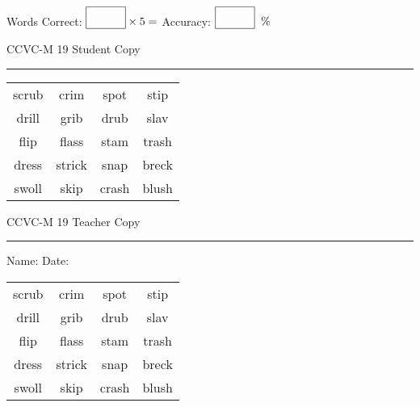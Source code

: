 \documentclass{memoir}
\begin{document}
\small

Words Correct: $\fbox{\phantom{\huge 100}} \times 5 = $ Accuracy: $\fbox{\phantom{\huge 100}}\;\; \%$ 

\vfill

\newpage


\footnotesize \noindent
CCVC-M 19 \hfill Student Copy
\smallskip
\hrule

\Large

\setlength{\tabcolsep}{14pt}
\def\arraystretch{3}

{\selectfont


\begin{vplace}[0.5]
\begin{center}
\begin{tabular}{cccc}
scrub & crim & spot & stip \\
drill & grib     & drub             & slav \\
flip & flass & stam            & trash \\
dress & strick & snap & breck       \\
swoll & skip & crash & blush \\
\end{tabular}
\end{center}
\end{vplace}

}

\newpage

\footnotesize \noindent
CCVC-M 19 \hfill Teacher Copy
\smallskip
\hrule

\small

\vfill

\noindent
Name: \underline{\hspace{1.75in}} \hfill Date: \underline{\hspace{1in}}

\Large

{\selectfont


\begin{vplace}[0.5]
\begin{center}
\begin{tabular}{cccc}
scrub & crim & spot & stip \\
drill & grib     & drub             & slav \\
flip & flass & stam            & trash \\
dress & strick & snap & breck       \\
swoll & skip & crash & blush \\
\end{tabular}
\end{center}
\end{vplace}



}
\end{document}
